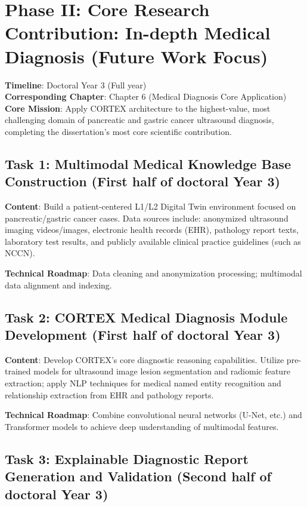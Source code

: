 \section{Phase II: Core Research Contribution: In-depth Medical Diagnosis (Future Work Focus)}

\textbf{Timeline}: Doctoral Year 3 (Full year)\\
\textbf{Corresponding Chapter}: Chapter 6 (Medical Diagnosis Core Application)\\
\textbf{Core Mission}: Apply CORTEX architecture to the highest-value, most challenging domain of pancreatic and gastric cancer ultrasound diagnosis, completing the dissertation's most core scientific contribution.

\subsection{Task 1: Multimodal Medical Knowledge Base Construction (First half of doctoral Year 3)}

\textbf{Content}: Build a patient-centered L1/L2 Digital Twin environment focused on pancreatic/gastric cancer cases. Data sources include: anonymized ultrasound imaging videos/images, electronic health records (EHR), pathology report texts, laboratory test results, and publicly available clinical practice guidelines (such as NCCN).

\textbf{Technical Roadmap}: Data cleaning and anonymization processing; multimodal data alignment and indexing.

\subsection{Task 2: CORTEX Medical Diagnosis Module Development (First half of doctoral Year 3)}

\textbf{Content}: Develop CORTEX's core diagnostic reasoning capabilities. Utilize pre-trained models for ultrasound image lesion segmentation and radiomic feature extraction; apply NLP techniques for medical named entity recognition and relationship extraction from EHR and pathology reports.

\textbf{Technical Roadmap}: Combine convolutional neural networks (U-Net, etc.) and Transformer models to achieve deep understanding of multimodal features.

\subsection{Task 3: Explainable Diagnostic Report Generation and Validation (Second half of doctoral Year 3)}

